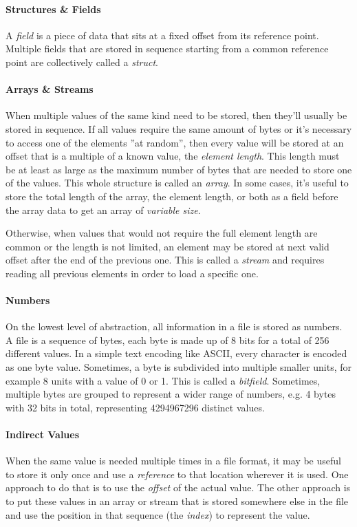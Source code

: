 \paragraph{Structures \& Fields}
A \textit{field} is a piece of data that sits at a fixed offset from its reference point. Multiple fields that are stored in sequence starting from a common reference point are collectively called a \textit{struct}.

\paragraph{Arrays \& Streams}
When multiple values of the same kind need to be stored, then they'll usually be stored in sequence. If all values require the same amount of bytes or it's necessary to access one of the elements ''at random'', then every value will be stored at an offset that is a multiple of a known value, the \textit{element length}. This length must be at least as large as the maximum number of bytes that are needed to store one of the values. This whole structure is called an \textit{array}. In some cases, it's useful to store the total length of the array, the element length, or both as a field before the array data to get an array of \textit{variable size}.

Otherwise, when values that would not require the full element length are common or the length is not limited, an element may be stored at next valid offset after the end of the previous one. This is called a \textit{stream} and requires reading all previous elements in order to load a specific one.

\paragraph{Numbers}
On the lowest level of abstraction, all information in a file is stored as numbers. A file is a sequence of \glspl{byte}, each \gls{byte} is made up of 8 \glspl{bit} for a total of 256 different values. In a simple text encoding like ASCII, every character is encoded as one byte value. Sometimes, a byte is subdivided into multiple smaller units, for example 8 units with a value of 0 or 1. This is called a \textit{bitfield}. Sometimes, multiple bytes are grouped to represent a wider range of numbers, e.g. 4 bytes with 32 bits in total, representing 4294967296 distinct values.

\paragraph{Indirect Values}
When the same value is needed multiple times in a file format, it may be useful to store it only once and use a \textit{reference} to that location wherever it is used. One approach to do that is to use the \textit{offset} of the actual value. The other approach is to put these values in an array or stream that is stored somewhere else in the file and use the position in that sequence (the \textit{index}) to represent the value.


